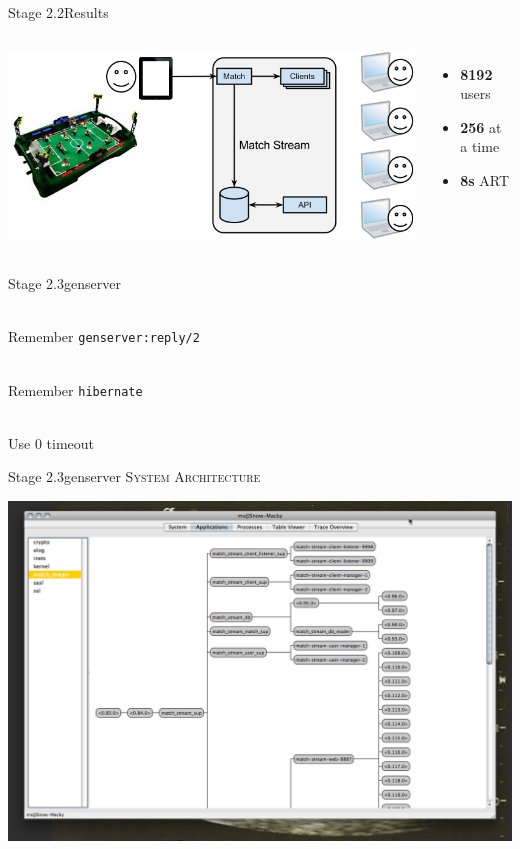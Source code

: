 \documentclass[utf8]{beamer}
\begin{document}
\begin{frame}{Stage 2.2}{Results}
	\begin{columns}
			\includegraphics[top=-1,width=\textwidth]{img/results-3-2.png}
			\begin{itemize}
				\item \textbf{\Large 8192} users
				\item \textbf{\Large 256} at a time
				\item \textbf{\Large 8s} ART
			\end{itemize}
	\end{columns}
\end{frame}
\begin{frame}{Stage 2.3}{gen\textunderscore server}
	\begin{description}
		\item<+->[Call Timeouts]\ \\
			Remember \texttt{gen\textunderscore server:reply/2}
		\item<+->[Memory Footprint]\ \\
			Remember \texttt{hibernate}
		\item<+->[Long \texttt{init/1}]\ \\
			Use $0$ timeout
	\end{description}
\end{frame}
\begin{frame}{Stage 2.3}{gen\textunderscore server}
	\textsc{System Architecture}
	\begin{center}
		\includegraphics[height=.75\textheight]{img/running-late.png}
	\end{center}
\end{frame}
\end{document}

